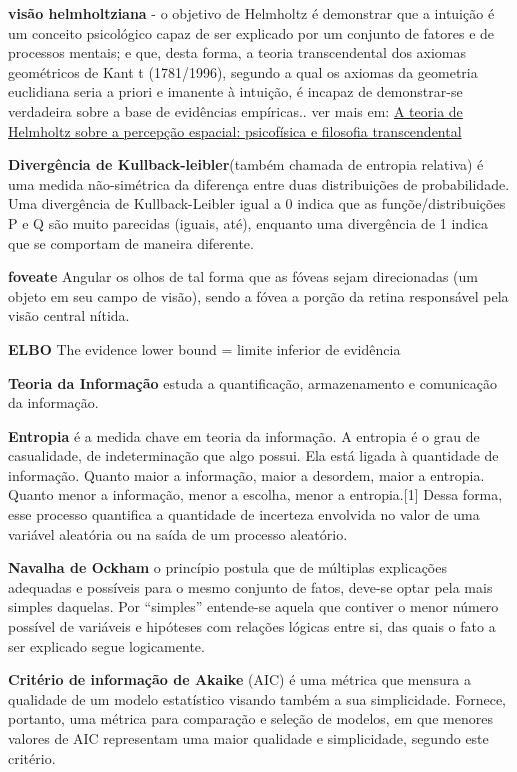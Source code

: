 \documentclass[
  12pt,
]{book}
\begin{document}
\textbf{visão helmholtziana} - o objetivo de Helmholtz é demonstrar que a intuição é um conceito psicológico capaz de ser explicado por um conjunto de fatores e de processos mentais; e que, desta forma, a teoria transcendental dos axiomas geométricos de Kant t (1781/1996), segundo a qual os axiomas da geometria euclidiana seria a
priori e imanente à intuição, é incapaz de demonstrar-se verdadeira sobre a base de
evidências empíricas..
ver mais em: \href{https://periodicos.ufmg.br/index.php/memorandum/article/download/6857/4411/22713}{A teoria de Helmholtz sobre a percepção espacial: psicofísica e
filosofia transcendental}

\textbf{Divergência de Kullback-leibler}(também chamada de entropia relativa) é uma medida não-simétrica da diferença entre duas distribuições de probabilidade. Uma divergência de Kullback-Leibler igual a 0 indica que as funçõe/distribuições P e Q são muito parecidas (iguais, até), enquanto uma divergência de 1 indica que se comportam de maneira diferente.

\textbf{foveate} Angular os olhos de tal forma que as fóveas sejam direcionadas (um objeto em seu campo de visão), sendo a fóvea a porção da retina responsável pela visão central nítida.

\textbf{ELBO} The evidence lower bound = limite inferior de evidência

\textbf{Teoria da Informação} estuda a quantificação, armazenamento e comunicação da informação.

\textbf{Entropia} é a medida chave em teoria da informação. A entropia é o grau de casualidade, de indeterminação que algo possui. Ela está ligada à quantidade de informação. Quanto maior a informação, maior a desordem, maior a entropia. Quanto menor a informação, menor a escolha, menor a entropia.{[}1{]} Dessa forma, esse processo quantifica a quantidade de incerteza envolvida no valor de uma variável aleatória ou na saída de um processo aleatório.

\textbf{Navalha de Ockham} o princípio postula que de múltiplas explicações adequadas e possíveis para o mesmo conjunto de fatos, deve-se optar pela mais simples daquelas. Por ``simples'' entende-se aquela que contiver o menor número possível de variáveis e hipóteses com relações lógicas entre si, das quais o fato a ser explicado segue logicamente.

\textbf{Critério de informação de Akaike} (AIC) é uma métrica que mensura a qualidade de um modelo estatístico visando também a sua simplicidade. Fornece, portanto, uma métrica para comparação e seleção de modelos, em que menores valores de AIC representam uma maior qualidade e simplicidade, segundo este critério.
\end{document}

